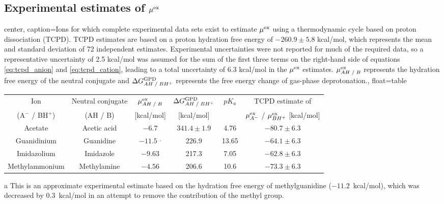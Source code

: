 \documentclass[journal=jacsat,articletitle=true,manuscript=suppinfo,layout=onecolumn]{achemso}
\begin{document}
    \subsection{Experimental estimates of $\mu^{\rm{ex}}$}
    
    \begin{adjustbox}{center, 
    caption={Ions for which complete experimental data sets exist to estimate $\mu^{\rm{ex}}$ using a thermodynamic cycle based on proton dissociation (TCPD). \cite{Fossat2021, Lim1991, Pearson1986, Reif2012} TCPD estimates are based on a proton hydration free energy of $-260.9 \pm 5.8$ kcal/mol, which represents the mean and standard deviation of 72 independent estimates.\cite{Fossat2021} Experimental uncertainties were not reported for much of the required data, so a representative uncertainty of 2.5 kcal/mol was assumed for the sum of the first three terms on the right-hand side of equations \ref{eq:tcpd_anion} and \ref{eq:tcpd_cation}, leading to a total uncertainty of 6.3 kcal/mol in the $\mu^{\rm{ex}}$ estimates. $\mu^{\rm{ex}}_{AH \; / \; B}$ represents the hydration free energy of the neutral conjugate and $\Delta G^{\rm{GPD}}_{AH \; / \; BH^+}$ represents the free energy change of gas-phase deprotonation.}, float=table}
    \centering
    \label{tab:thermo_cycle_data}
    \renewcommand{\arraystretch}{0.8}
    \begin{threeparttable}
    \begin{tabular}{c | c | c | c | c | c}
    Ion & Neutral conjugate & $\mu^{\rm{ex}}_{AH \; / \; B}$ & $\Delta G^{\rm{GPD}}_{AH \; / \; BH^+}$ & $pK_a$ & TCPD estimate of \\
    (A$^-$ / BH$^+$) & (AH / B)  & [kcal/mol] & [kcal/mol] & & $\mu^{\rm{ex}}_{A^-}$ / $\mu^{\rm{ex}}_{BH^+}$ [kcal/mol] \\ \hline
    Acetate & Acetic acid & $-6.7$ \cite{Cramer1991} & $341.4 \pm 1.9$ \cite{Taft1987, Cumming1977, Fujio1981} & 4.76 \cite{Settimo2014} & $-80.7 \pm 6.3$\\
    Guanidinium & Guanidine & $-11.5$ \cite{Zhang2017}$^{,}$\tnote{a} & 226.9\cite{Hunter1998} & 13.65\cite{Wolfenden1981} & $-64.1 \pm 6.3$\\
    Imidazolium & Imidazole & $-9.63$ \cite{Rizzo2006} & 217.3 \cite{Hunter1998} & 7.05 \cite{Walba1961} & $-62.8 \pm 6.3$\\
    Methylammonium & Methylamine & $-4.56$ \cite{In2005} & 206.6 \cite{Hunter1998} & 10.6 \cite{Lim1991} & $-73.3 \pm 6.3$
    \end{tabular}
    \begin{tablenotes}
        \linespread{1}\small
        \item[a] This is an approximate experimental estimate based on the hydration free energy of methylguanidine ($-11.2$~kcal/mol)\cite{Wolfenden1981}, which was decreased by 0.3~kcal/mol in an attempt to remove the contribution of the methyl group.\cite{Reif2012} 
    \end{tablenotes}
    \end{threeparttable}
    \end{adjustbox}    
\end{document}
